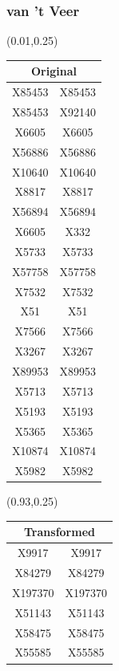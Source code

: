 \documentclass{beamer}
\begin{document}
\begin{frame}
  \frametitle{van 't Veer}
  \begin{textblock*}{\paperwidth}(0.01\textwidth,0.25\textheight)
    \raggedright 
    \tiny
    \begin{tabular}{| c c |}
      \hline
\toprule
\multicolumn{2}{c}{Original} \\ 
\midrule \hline
X85453  &  X85453 \\ \hline 
X85453  &  X92140 \\ \hline 
X6605  &  X6605 \\ \hline 
X56886  &  X56886 \\ \hline 
X10640  &  X10640 \\ \hline 
X8817  &  X8817 \\ \hline 
X56894  &  X56894 \\ \hline 
X6605  &  X332 \\ \hline 
X5733  &  X5733 \\ \hline 
X57758  &  X57758 \\ \hline 
X7532  &  X7532 \\ \hline 
X51  &  X51 \\ \hline 
X7566  &  X7566 \\ \hline 
X3267  &  X3267 \\ \hline 
X89953  &  X89953 \\ \hline 
X5713  &  X5713 \\ \hline 
X5193  &  X5193 \\ \hline 
X5365  &  X5365 \\ \hline 
X10874  &  X10874 \\ \hline 
X5982  &  X5982 \\ \hline 
    \end{tabular}
    \hspace{.5em}
  \end{textblock*}
  \begin{textblock*}{\paperwidth}(0.93\textwidth,0.25\textheight)
    \raggedright 
    \tiny
    \begin{tabular}{| c c |}
      \hline
\toprule
\multicolumn{2}{c}{Transformed} \\ 
\midrule \hline
X9917  &  X9917 \\ \hline 
X84279  &  X84279 \\ \hline 
X197370  &  X197370 \\ \hline 
X51143  &  X51143 \\ \hline 
X58475  &  X58475 \\ \hline 
X55585  &  X55585 \\ \hline 

\end{tabular}
\end{textblock*}
\end{frame}
\end{document}
